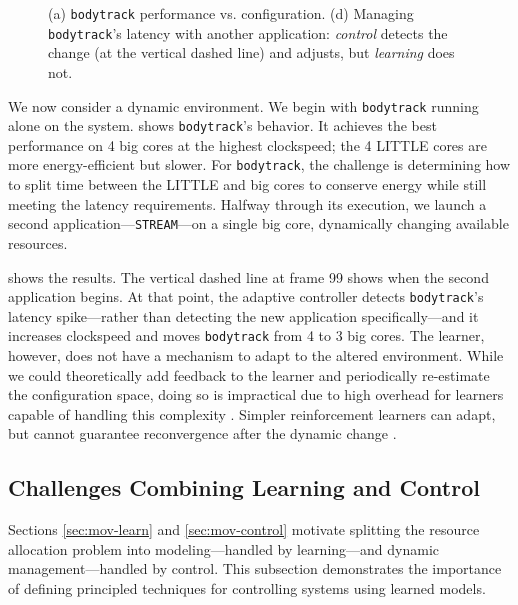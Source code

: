 \begin{figure}
\centering
  \subfloat[]
  {
    
    \label{fig:BODYTRACK_timeline}    
  }
  \caption{(a) \texttt{bodytrack} performance vs. configuration. (d)
    Managing \texttt{bodytrack}'s latency with another
    application: \emph{control} detects the change (at the vertical
    dashed line) and adjusts, but \emph{learning} does not.}
  \label{fig:control}
\end{figure}


We now consider a dynamic environment.  We begin with
\texttt{bodytrack} running alone on the system.
 shows \texttt{bodytrack}'s behavior.
It achieves the best performance on 4 big cores at the highest
clockspeed; the 4 LITTLE cores are more energy-efficient but slower.
For \texttt{bodytrack}, the challenge is determining how to split time
between the LITTLE and big cores to conserve energy while still
meeting the latency requirements. Halfway through its execution,
we launch a second application---\texttt{STREAM}---on a single big
core, dynamically changing available resources.

 shows the results.  The vertical
dashed line at frame 99 shows when the second application begins.  At
that point, the adaptive controller detects \texttt{bodytrack}'s
latency spike---rather than detecting the new application
specifically---and it increases clockspeed and moves
\texttt{bodytrack} from 4 to 3 big cores.  The learner, however, does
not have a mechanism to adapt to the altered environment.  While we
could theoretically add feedback to the learner and periodically
re-estimate the configuration space, doing so is impractical due to
high overhead for learners capable of handling this complexity
\cite{Paragon,quasar,LEO}.  Simpler reinforcement learners can adapt,
but cannot guarantee reconvergence after the dynamic change
\cite{RL,TAAS}.


\subsection{Challenges Combining Learning and Control}
Sections \ref{sec:mov-learn} and \ref{sec:mov-control} motivate
splitting the resource allocation problem into modeling---handled by
learning---and dynamic management---handled by control. This
subsection demonstrates the importance of defining principled
techniques for controlling systems using learned models.

